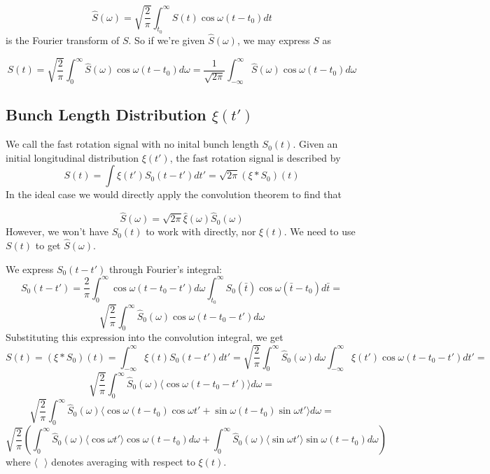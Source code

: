 \begin{equation}
\hat{S}(\omega)=\sqrt{\frac{2}{\pi}}\int^{\infty}_{t_0}S(t)\cos\omega(t-t_0)dt
\label{eq:nospreadFT}
\end{equation} 
is the Fourier transform of $S$. So if we're given $\hat{S}(\omega)$, we may express $S$ as 

\begin{equation}
S(t)=\sqrt{\frac{2}{\pi}}\int^{\infty}_0\hat{S}(\omega)\cos\omega(t-t_0)d\omega=\frac{1}{\sqrt{2\pi}}\int^{\infty}_{-\infty}\hat{S}(\omega)\cos\omega(t-t_0)d\omega
\label{eq:nospreadIFT}
\end{equation}

\subsection{Bunch Length Distribution $\xi(t')$}
We call the fast rotation signal with no inital bunch length $S_0(t)$. Given an initial longitudinal distribution $\xi(t')$, the fast rotation signal is described by \[S(t)=\int\xi(t')S_0(t-t')dt'=\sqrt{2\pi}(\xi\ast S_0)(t)\] In the ideal case we would directly apply the convolution theorem to find that 

\begin{equation}
\hat{S}(\omega)=\sqrt{2\pi}\hat{\xi}(\omega)\hat{S}_0(\omega)
\label{eq:ConvoSpectrum}
\end{equation} However, we won't have $S_0(t)$ to work with directly, nor $\xi(t)$. We need to use $S(t)$ to get $\hat{S}(\omega)$. 

We express $S_0(t-t')$ through Fourier's integral: \[S_0(t-t')=\frac{2}{\pi}\int^{\infty}_0\cos\omega(t-t_0-t')d\omega\int^{\infty}_{t_0}S_0(\bar{t})\cos\omega(\bar{t}-t_0)d\bar{t}=\]\[\sqrt{\frac{2}{\pi}}\int^{\infty}_0\hat{S}_0(\omega)\cos\omega(t-t_0-t')d\omega\] Substituting this expression into the convolution integral, we get \[S(t)=(\xi\ast S_0)(t)=\int^{\infty}_{-\infty}\xi(t)S_0(t-t')dt'=\sqrt{\frac{2}{\pi}}\int^{\infty}_0\hat{S}_0(\omega)d\omega\int^{\infty}_{-\infty}\xi(t')\cos\omega(t-t_0-t')dt'=\]\[\sqrt{\frac{2}{\pi}}\int^{\infty}_0\hat{S}_0(\omega)\langle\cos\omega(t-t_0-t')\rangle d\omega=\]\[\sqrt{\frac{2}{\pi}}\int^{\infty}_0\hat{S}_0(\omega)\langle\cos\omega(t-t_0)\cos\omega t'+\sin\omega(t-t_0)\sin\omega t'\rangle d\omega=\]\[\sqrt{\frac{2}{\pi}}\left(\int^{\infty}_0\hat{S}_0(\omega)\langle\cos\omega t'\rangle\cos\omega(t-t_0)d\omega+\int^{\infty}_0\hat{S}_0(\omega)\langle\sin\omega t'\rangle\sin\omega(t-t_0)d\omega\right)\] where $\langle\text{ }\rangle$ denotes averaging with respect to $\xi(t)$. 

